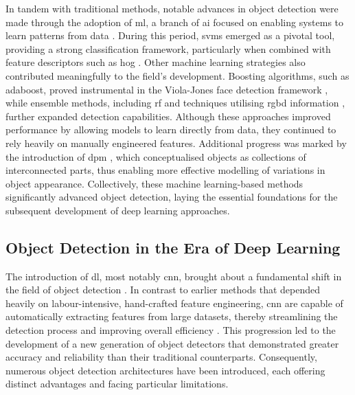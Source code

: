 In tandem with traditional methods, notable advances in object detection were made through the adoption of \gls{ml}, a branch of \gls{ai} focused on enabling systems to learn patterns from data \cite{machine_learning}. During this period, \gls{svms} \cite{hearst1998support} emerged as a pivotal tool, providing a strong classification framework, particularly when combined with feature descriptors such as \gls{hog} \cite{bhatt2023state}. Other machine learning strategies also contributed meaningfully to the field's development. Boosting algorithms, such as \gls{adaboost}, proved instrumental in the Viola-Jones face detection framework \cite{viola2001rapid}, while ensemble methods, including \gls{rf} \cite{saffari2009line} and techniques utilising \gls{rgbd} information \cite{seychell16}, further expanded detection capabilities. Although these approaches improved performance by allowing models to learn directly from data, they continued to rely heavily on manually engineered features. Additional progress was marked by the introduction of \gls{dpm} \cite{felzenszwalb2009object}, which conceptualised objects as collections of interconnected parts, thus enabling more effective modelling of variations in object appearance. Collectively, these machine learning-based methods significantly advanced object detection, laying the essential foundations for the subsequent development of deep learning approaches.

\subsection{Object Detection in the Era of Deep Learning}
\label{subsec:2_detection_in_dl}

The introduction of \gls{dl}, most notably \gls{cnn}, brought about a fundamental shift in the field of object detection \cite{cnn_survey}. In contrast to earlier methods that depended heavily on labour-intensive, hand-crafted feature engineering, \gls{cnn} are capable of automatically extracting features from large datasets, thereby streamlining the detection process and improving overall efficiency \cite{feature_learning, deep_learning_review, cnns}. This progression led to the development of a new generation of object detectors that demonstrated greater accuracy and reliability than their traditional counterparts. Consequently, numerous object detection architectures have been introduced, each offering distinct advantages and facing particular limitations.


